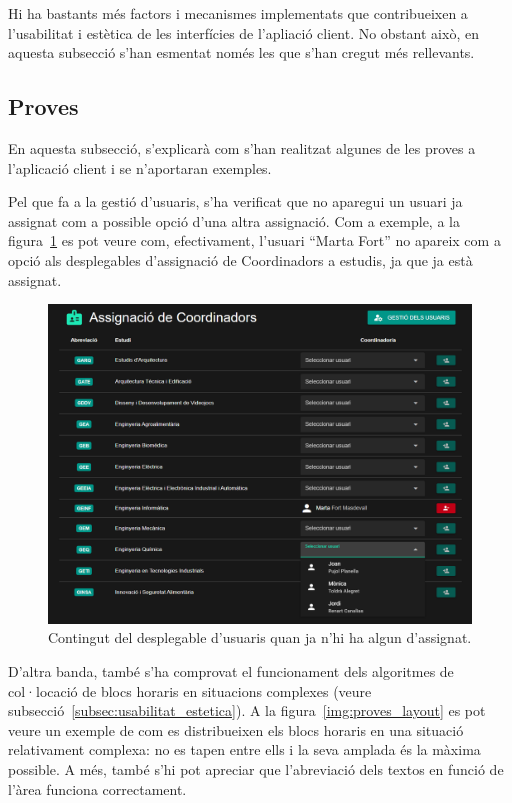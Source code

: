\documentclass[a4paper,12pt]{ThesisStyle}
\begin{document}
Hi ha bastants més factors i mecanismes implementats que contribueixen a l'usabilitat i estètica de les interfícies de l'apliació client. No obstant això, en aquesta subsecció s'han esmentat només les que s'han cregut més rellevants.

\subsection{Proves}
\label{subsec:proves_client}

En aquesta subsecció, s'explicarà com s'han realitzat algunes de les proves a l'aplicació client i se n'aportaran exemples.

Pel que fa a la gestió d'usuaris, s'ha verificat que no aparegui un usuari ja assignat com a possible opció d'una altra assignació. Com a exemple, a la figura~\ref{img:assignUser} es pot veure com, efectivament, l'usuari ``Marta Fort'' no apareix com a opció als desplegables d'assignació de Coordinadors a estudis, ja que ja està assignat.

\begin{figure}[H]
  \centering
  \includegraphics[width=\textwidth]{assets/proves/assignUser.png}
  \caption{\label{img:assignUser} Contingut del desplegable d'usuaris quan ja n'hi ha algun d'assignat.}
\end{figure}

D'altra banda, també s'ha comprovat el funcionament dels algoritmes de col·locació de blocs horaris en situacions complexes (veure subsecció~\ref{subsec:usabilitat_estetica}). A la figura~\ref{img:proves_layout} es pot veure un exemple de com es distribueixen els blocs horaris en una situació relativament complexa: no es tapen entre ells i la seva amplada és la màxima possible. A més, també s'hi pot apreciar que l'abreviació dels textos en funció de l'àrea funciona correctament.
\end{document}
